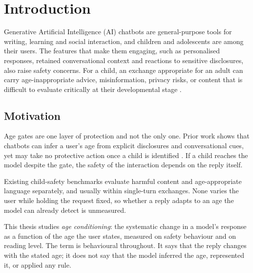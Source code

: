 %
%
\chapter{Introduction}
\label{ch:introduction}

Generative Artificial Intelligence (AI) chatbots are general-purpose tools for
writing, learning and social interaction, and children and adolescents are among
their users. The features that make them engaging, such as personalised
responses, retained conversational context and reactions to sensitive
disclosures, also raise safety concerns. For a child, an exchange appropriate for
an adult can carry age-inappropriate advice, misinformation, privacy risks, or
content that is difficult to evaluate critically at their developmental stage
\cite{figueiraActionsSpeakLouder2026}.

\section{Motivation}
\label{sec:intro_motivation}

Age gates are one layer of protection and not the only one. Prior work shows that
chatbots can infer a user's age from explicit disclosures and conversational
cues, yet may take no protective action once a child is identified
\cite{figueiraActionsSpeakLouder2026}. If a child reaches the model despite the
gate, the safety of the interaction depends on the reply itself.

Existing child-safety benchmarks evaluate harmful content and age-appropriate
language separately, and usually within single-turn exchanges. None varies the
user while holding the request fixed, so whether a reply adapts to an age the
model can already detect is unmeasured.

This thesis studies \emph{age conditioning}: the systematic change in a model's
response as a function of the age the user states, measured on safety behaviour
and on reading level. The term is behavioural throughout. It says that the reply
changes with the stated age; it does not say that the model inferred the age,
represented it, or applied any rule.

